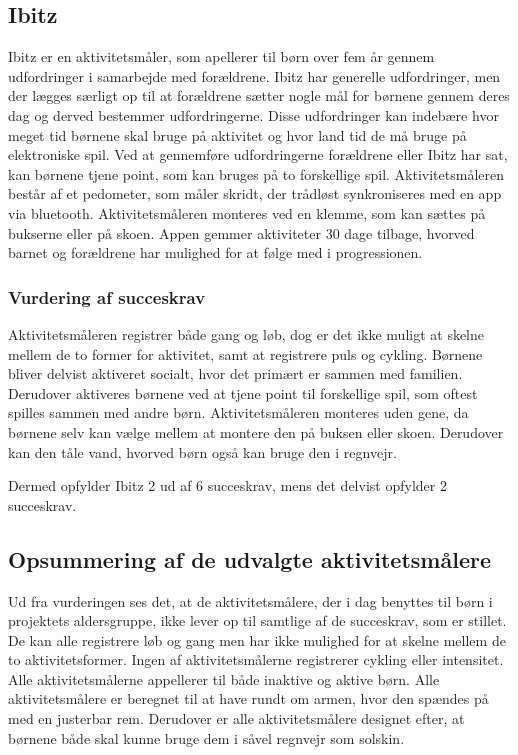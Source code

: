 \subsection{Ibitz}
Ibitz er en aktivitetsmåler, som apellerer til børn over fem år gennem udfordringer i samarbejde med forældrene. Ibitz har generelle udfordringer, men der lægges særligt op til at forældrene sætter nogle mål for børnene gennem deres dag og derved bestemmer udfordringerne. Disse udfordringer kan indebære hvor meget tid børnene skal bruge på aktivitet og hvor land tid de må bruge på elektroniske spil. Ved at gennemføre udfordringerne forældrene eller Ibitz har sat, kan børnene tjene point, som kan bruges på to forskellige spil. \newline
Aktivitetsmåleren består af et pedometer, som måler skridt, der trådløst synkroniseres med en app via bluetooth. Aktivitetsmåleren monteres ved en klemme, som kan sættes på bukserne eller på skoen. Appen gemmer aktiviteter 30 dage tilbage, hvorved barnet og forældrene har mulighed for at følge med i progressionen. \citep{Ibitz_features2016}

\subsubsection{Vurdering af succeskrav}
Aktivitetsmåleren registrer både gang og løb, dog er det ikke muligt at skelne mellem de to former for aktivitet, samt at registrere puls og cykling. Børnene bliver delvist aktiveret socialt, hvor det primært er sammen med familien. Derudover aktiveres børnene ved at tjene point til forskellige spil, som oftest spilles sammen med andre børn. Aktivitetsmåleren monteres uden gene, da børnene selv kan vælge mellem at montere den på buksen eller skoen. Derudover kan den tåle vand, hvorved børn også kan bruge den i regnvejr.  

Dermed opfylder Ibitz 2 ud af 6 succeskrav, mens det delvist opfylder 2 succeskrav.

\subsection{Opsummering af de udvalgte aktivitetsmålere}
Ud fra vurderingen ses det, at de aktivitetsmålere, der i dag benyttes til børn i projektets aldersgruppe, ikke lever op til samtlige af de succeskrav, som er stillet. De kan alle registrere løb og gang men har ikke mulighed for at skelne mellem de to aktivitetsformer. Ingen af aktivitetsmålerne registrerer cykling eller intensitet. Alle aktivitetsmålerne appellerer til både inaktive og aktive børn. Alle aktivitetsmålere er beregnet til at have rundt om armen, hvor den spændes på med en justerbar rem. Derudover er alle aktivitetsmålere designet efter, at børnene både skal kunne bruge dem i såvel regnvejr som solskin.

